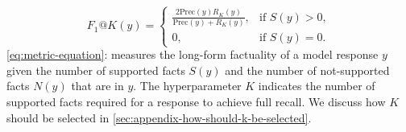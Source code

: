 \begin{minipage}[t]{\linewidth}
    \vspace{-2mm}
    \begin{equation}
        F_1 @ K (y) = 
        \begin{cases}
            \frac{2\text{Prec}(y) R_K(y)}{\text{Prec}(y) + R_K(y)},  & \text{if } S(y) > 0,\\
            0,                 & \text{if } S(y) = 0.
        \end{cases}
        \label{eq:metric-equation}
    \end{equation}
    \cref{eq:metric-equation}: \metric{} measures the long-form factuality of a model response $y$ given the number of supported facts $S(y)$ and the number of not-supported facts $N(y)$ that are in $y$.
    The hyperparameter $K$ indicates the number of supported facts required for a response to achieve full recall.
    We discuss how $K$ should be selected in \cref{sec:appendix-how-should-k-be-selected}.
    \vspace{-4mm}
\end{minipage}